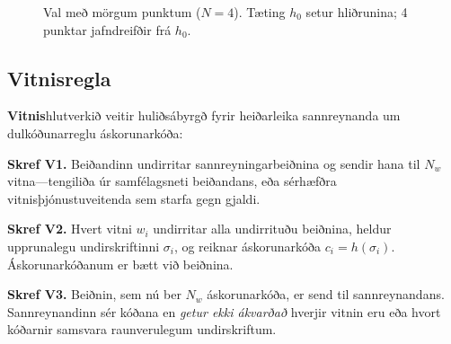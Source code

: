 \documentclass[11pt,a4paper,twocolumn]{article}
\begin{document}
\begin{figure}[ht]
\centering
{}
\caption{Val með mörgum punktum ($N{=}4$). Tæting $h_0$ setur hliðrunina; 4 punktar jafndreifðir frá $h_0$.}
\label{fig:multipoint}
\end{figure}

\subsection{Vitnisregla}

\textbf{Vitnis}hlutverkið veitir huliðsábyrgð fyrir heiðarleika sannreynanda um dulkóðunarreglu áskorunarkóða:

\textbf{Skref V1.} Beiðandinn undirritar sannreyningarbeiðnina og sendir hana til $N_w$ vitna---tengiliða úr samfélagsneti beiðandans, eða sérhæfðra vitnisþjónustuveitenda sem starfa gegn gjaldi.

\textbf{Skref V2.} Hvert vitni $w_i$ undirritar alla undirrituðu beiðnina, heldur upprunalegu undirskriftinni $\sigma_i$, og reiknar áskorunarkóða $c_i = h(\sigma_i)$. Áskorunarkóðanum er bætt við beiðnina.

\textbf{Skref V3.} Beiðnin, sem nú ber $N_w$ áskorunarkóða, er send til sannreynandans. Sannreynandinn sér kóðana en \emph{getur ekki ákvarðað} hverjir vitnin eru eða hvort kóðarnir samsvara raunverulegum undirskriftum.
\end{document}
